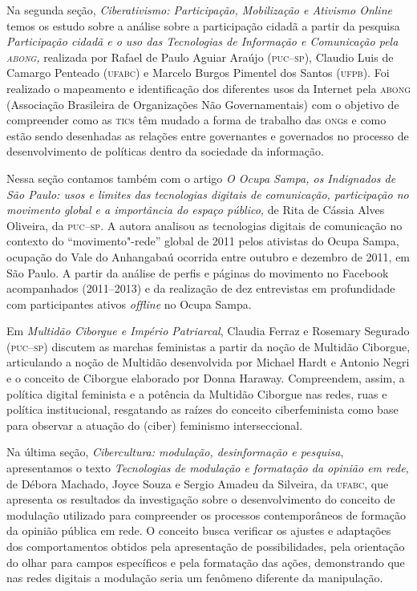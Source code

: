 Na segunda seção, \emph{Ciberativismo: Participação, Mobilização e
Ativismo Online} temos os estudo sobre a análise sobre a participação
cidadã a partir da pesquisa \emph{Participação cidadã e o uso das
Tecnologias de Informação e Comunicação pela \textsc{abong},} realizada por
Rafael de Paulo Aguiar Araújo (\textsc{puc--sp}), Claudio Luis de Camargo Penteado
(\textsc{ufabc}) e Marcelo Burgos Pimentel dos Santos (\textsc{ufpb}). Foi realizado o
mapeamento e identificação dos diferentes usos da Internet pela
\textsc{abong} (Associação Brasileira de Organizações Não Governamentais) com o
objetivo de compreender como as \textsc{tic}s têm mudado a forma de trabalho das \textsc{ong}s
e como estão sendo desenhadas as relações entre governantes
e governados no processo de desenvolvimento de políticas dentro da
sociedade da informação.

Nessa seção contamos também com o artigo \emph{O Ocupa Sampa, os
Indignados de São Paulo: usos e limites das tecnologias digitais de
comunicação, participação no movimento global e a importância do espaço
público,} de Rita de Cássia Alves Oliveira, da \textsc{puc--sp}. A autora analisou
as tecnologias digitais de comunicação no contexto do
``movimento"-rede'' global de 2011 pelos ativistas do Ocupa Sampa,
ocupação do Vale do Anhangabaú ocorrida entre outubro e dezembro de
2011, em São Paulo. A partir da análise de perfis e páginas do movimento
no Facebook acompanhados (2011--2013) e da realização de dez entrevistas
em profundidade com participantes ativos \emph{offline} no Ocupa Sampa.

Em \emph{Multidão Ciborgue e Império Patriarcal}, Claudia Ferraz e
Rosemary Segurado (\textsc{puc--sp}) discutem as marchas feministas a partir da
noção de Multidão Ciborgue, articulando a noção de Multidão desenvolvida
por Michael Hardt e Antonio Negri e o conceito de Ciborgue elaborado por
Donna Haraway. Compreendem, assim, a política digital feminista e a
potência da Multidão Ciborgue nas redes, ruas e política institucional,
resgatando as raízes do conceito ciberfeminista como base para observar
a atuação do (ciber) feminismo interseccional.

Na última seção, \emph{Cibercultura: modulação, desinformação e
pesquisa}, apresentamos o texto \emph{Tecnologias de modulação e
formatação da opinião em rede,} de Débora Machado, Joyce Souza e Sergio
Amadeu da Silveira, da \textsc{ufabc}, que apresenta os resultados da
investigação sobre o desenvolvimento do conceito de modulação utilizado
para compreender os processos contemporâneos de formação da opinião
pública em rede. O conceito busca verificar os ajustes e adaptações dos
comportamentos obtidos pela apresentação de possibilidades, pela
orientação do olhar para campos específicos e pela formatação das ações,
demonstrando que nas redes digitais a modulação seria um fenômeno
diferente da manipulação.

